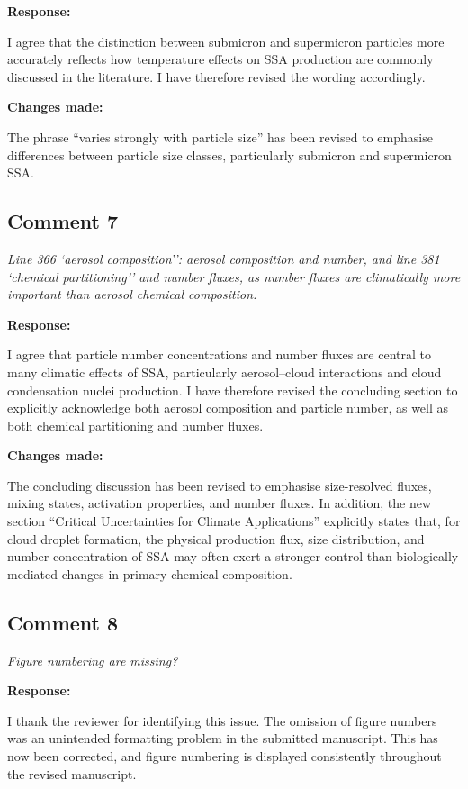 \documentclass[11pt]{article}
\begin{document}
\textbf{Response:}

I agree that the distinction between submicron and supermicron particles more accurately reflects how temperature effects on SSA production are commonly discussed in the literature. I have therefore revised the wording accordingly.

\textbf{Changes made:}

The phrase ``varies strongly with particle size'' has been revised to emphasise differences between particle size classes, particularly submicron and supermicron SSA.

\subsection*{Comment 7}

\emph{Line 366 `aerosol composition'': aerosol composition and number, and line 381 `chemical partitioning'' and number fluxes, as number fluxes are climatically more important than aerosol chemical composition.}

\textbf{Response:}

I agree that particle number concentrations and number fluxes are central to many climatic effects of SSA, particularly aerosol--cloud interactions and cloud condensation nuclei production. I have therefore revised the concluding section to explicitly acknowledge both aerosol composition and particle number, as well as both chemical partitioning and number fluxes.

\textbf{Changes made:}

The concluding discussion has been revised to emphasise size-resolved fluxes, mixing states, activation properties, and number fluxes. In addition, the new section ``Critical Uncertainties for Climate Applications'' explicitly states that, for cloud droplet formation, the physical production flux, size distribution, and number concentration of SSA may often exert a stronger control than biologically mediated changes in primary chemical composition.

\subsection*{Comment 8}

\emph{Figure numbering are missing?}

\textbf{Response:}

I thank the reviewer for identifying this issue. The omission of figure numbers was an unintended formatting problem in the submitted manuscript. This has now been corrected, and figure numbering is displayed consistently throughout the revised manuscript.
\end{document}
